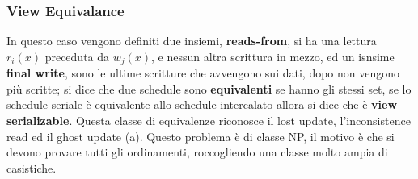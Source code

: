 \documentclass[12pt]{article}
\begin{document}
\subsubsection{View Equivalance}
In questo caso vengono definiti due insiemi, \textbf{reads-from}, si ha una lettura $r_i(x)$ preceduta da $w_j(x)$, e nessun altra scrittura in mezzo, ed un isnsime \textbf{final write}, sono le ultime scritture che avvengono sui dati, dopo non vengono pi\`u scritte; si dice che due schedule sono \textbf{equivalenti} se hanno gli stessi set, se lo schedule seriale \`e equivalente allo schedule intercalato allora si dice che \`e \textbf{view serializable}. Questa classe di equivalenze riconosce il lost update, l'inconsistence read ed il ghost update (a). Questo problema \`e di classe NP, il motivo \`e che si devono provare tutti gli ordinamenti, roccogliendo una classe molto ampia di casistiche.
\end{document}
